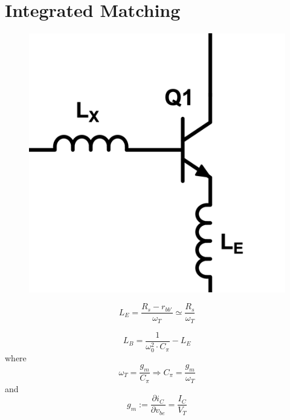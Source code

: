 \documentclass[10pt,a4paper]{article}
\begin{document}
\section{Integrated Matching}

\begin{figure}[h!]
\centering
\includegraphics[scale=0.46]{fig/L_im.png}
\caption{}\label{fig:L_im}
\end{figure}


\[
L_E = \frac{R_s - r_{bb'}}{\omega_T} \simeq \frac{R_s}{\omega_T} 
\]

\[
L_B = \frac{1}{\omega_0^2 \cdot C_{\pi}} - L_E %
\]
where 
\[
\omega_T = \frac{g_m}{C_{\pi}} \Rightarrow C_{\pi} = \frac{g_m}{\omega_T}
\]
and 
\[
g_m := \frac{\partial i_C}{\partial v_{be}} = \frac{I_C}{V_T }
\]
\end{document}
